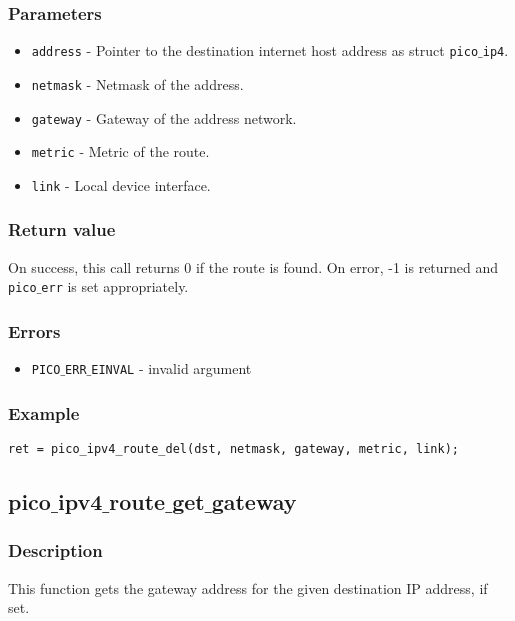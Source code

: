 \subsubsection*{Parameters}
\begin{itemize}[noitemsep]
\item \texttt{address} - Pointer to the destination internet host address as struct \texttt{pico$\_$ip4}.
\item \texttt{netmask} - Netmask of the address.
\item \texttt{gateway} - Gateway of the address network.
\item \texttt{metric} - Metric of the route.
\item \texttt{link} - Local device interface.
\end{itemize}

\subsubsection*{Return value}
On success, this call returns 0 if the route is found.
On error, -1 is returned and \texttt{pico$\_$err} is set appropriately.

\subsubsection*{Errors}
\begin{itemize}[noitemsep]
\item \texttt{PICO$\_$ERR$\_$EINVAL} - invalid argument
\end{itemize}

\subsubsection*{Example}
\begin{verbatim}
ret = pico_ipv4_route_del(dst, netmask, gateway, metric, link);
\end{verbatim}



\subsection{pico$\_$ipv4$\_$route$\_$get$\_$gateway}

\subsubsection*{Description}
This function gets the gateway address for the given destination IP address, if set.

